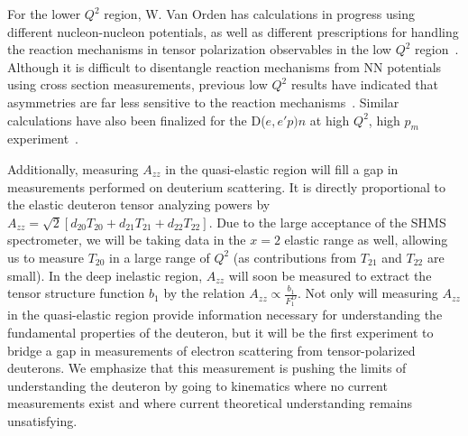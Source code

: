 For the lower $Q^2$ region, W. Van Orden has calculations in progress using different nucleon-nucleon potentials, as well as different prescriptions for handling the reaction mechanisms in tensor polarization observables in the low $Q^2$ region~\cite{vanorden-convo}. Although it is difficult to disentangle reaction mechanisms from NN potentials using cross section measurements, previous low $Q^2$ results have indicated that asymmetries are far less sensitive to the reaction mechanisms~\cite{Passchier:2001uc}. Similar calculations have also been finalized for the D($e,e'p)n$ at high $Q^2$, high $p_m$ experiment~\cite{Ford:2014yua}. 

Additionally, measuring $A_{zz}$ in the quasi-elastic region will fill a gap in measurements performed on deuterium scattering. It is directly proportional to the elastic deuteron tensor analyzing powers by $A_{zz} = \sqrt{2} \left[ d_{20} T_{20} + d_{21} T_{21} + d_{22} T_{22}\right]$. Due to the large acceptance of the SHMS spectrometer, we will be taking data in the $x = 2$ elastic range as well, allowing us to measure $T_{20}$ in a large range of $Q^2$ (as contributions from $T_{21}$ and $T_{22}$ are small). In the deep inelastic region, $A_{zz}$ will soon be measured to extract the tensor structure function $b_1$ by the relation $A_{zz} \propto \frac{b_1}{F_1^D}$. Not only will measuring $A_{zz}$ in the quasi-elastic region provide information necessary for understanding the fundamental properties of the deuteron, but it will be the first experiment to bridge a gap in measurements of electron scattering from tensor-polarized deuterons. We emphasize that this measurement is pushing the limits of understanding the deuteron by going to kinematics where no current measurements exist and where current theoretical understanding remains unsatisfying.



